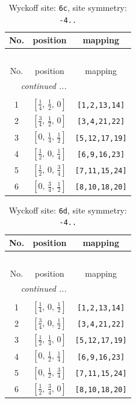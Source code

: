 \documentclass[fleqn,8pt]{jsarticle}
\begin{document}
\renewcommand{\arraystretch}{1.2}
\begin{longtable}{ccc}
\caption{Wyckoff site: {\tt 6c}, site symmetry: {\tt -4..}}
 \\
 \hline \hline
No. & position & mapping \\ \hline \endfirsthead

\multicolumn{2}{l}{\tablename\ \thetable{}} \\
 \hline \hline
No. & position & mapping \\ \hline \endhead

 \hline \hline
\multicolumn{2}{r}{\footnotesize\it continued ...} \\ \endfoot

 \hline \hline
\multicolumn{2}{r}{} \\ \endlastfoot

1 & $\left[ \frac{1}{4},\, \frac{1}{2},\, 0 \right]$ & {\tt [1,2,13,14]} \\ \hline
2 & $\left[ \frac{3}{4},\, \frac{1}{2},\, 0 \right]$ & {\tt [3,4,21,22]} \\ \hline
3 & $\left[ 0,\, \frac{1}{4},\, \frac{1}{2} \right]$ & {\tt [5,12,17,19]} \\ \hline
4 & $\left[ \frac{1}{2},\, 0,\, \frac{1}{4} \right]$ & {\tt [6,9,16,23]} \\ \hline
5 & $\left[ \frac{1}{2},\, 0,\, \frac{3}{4} \right]$ & {\tt [7,11,15,24]} \\ \hline
6 & $\left[ 0,\, \frac{3}{4},\, \frac{1}{2} \right]$ & {\tt [8,10,18,20]} \\
\end{longtable}
\renewcommand{\arraystretch}{1.2}
\begin{longtable}{ccc}
\caption{Wyckoff site: {\tt 6d}, site symmetry: {\tt -4..}}
 \\
 \hline \hline
No. & position & mapping \\ \hline \endfirsthead

\multicolumn{2}{l}{\tablename\ \thetable{}} \\
 \hline \hline
No. & position & mapping \\ \hline \endhead

 \hline \hline
\multicolumn{2}{r}{\footnotesize\it continued ...} \\ \endfoot

 \hline \hline
\multicolumn{2}{r}{} \\ \endlastfoot

1 & $\left[ \frac{1}{4},\, 0,\, \frac{1}{2} \right]$ & {\tt [1,2,13,14]} \\ \hline
2 & $\left[ \frac{3}{4},\, 0,\, \frac{1}{2} \right]$ & {\tt [3,4,21,22]} \\ \hline
3 & $\left[ \frac{1}{2},\, \frac{1}{4},\, 0 \right]$ & {\tt [5,12,17,19]} \\ \hline
4 & $\left[ 0,\, \frac{1}{2},\, \frac{1}{4} \right]$ & {\tt [6,9,16,23]} \\ \hline
5 & $\left[ 0,\, \frac{1}{2},\, \frac{3}{4} \right]$ & {\tt [7,11,15,24]} \\ \hline
6 & $\left[ \frac{1}{2},\, \frac{3}{4},\, 0 \right]$ & {\tt [8,10,18,20]} \\
\end{longtable}
\end{document}

